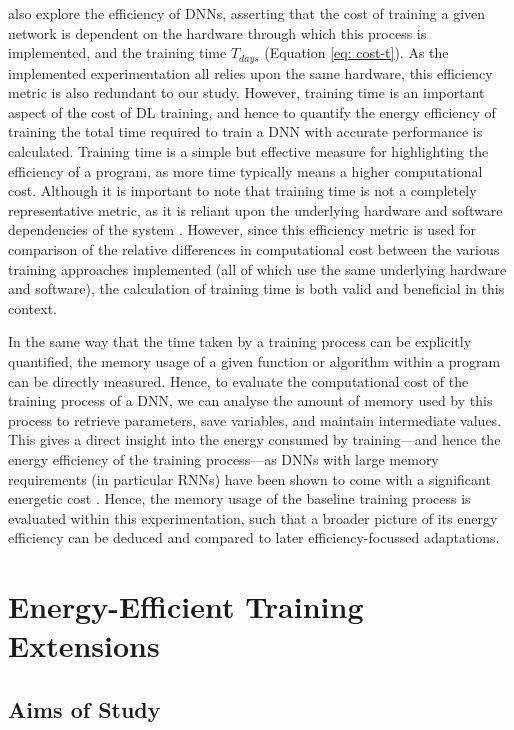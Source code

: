 \documentclass[a4paper, 11pt]{report}
\begin{document}
    \citet{amodei-2018} also explore the efficiency of DNNs, asserting that the cost of training a given network is dependent on the hardware through which this process is implemented, and the training time $T_{days}$ (Equation \ref{eq: cost-t}). As the implemented experimentation all relies upon the same hardware, this efficiency metric is also redundant to our study. However, training time is an important aspect of the cost of DL training, and hence to quantify the energy efficiency of training the total time required to train a DNN with accurate performance is calculated. Training time is a simple but effective measure for highlighting the efficiency of a program, as more time typically means a higher computational cost. Although it is important to note that training time is not a completely representative metric, as it is reliant upon the underlying hardware and software dependencies of the system \citep{schwartz-2019}. However, since this efficiency metric is used for comparison of the relative differences in computational cost between the various training approaches implemented (all of which use the same underlying hardware and software), the calculation of training time is both valid and beneficial in this context.

    In the same way that the time taken by a training process can be explicitly quantified, the memory usage of a given function or algorithm within a program can be directly measured. Hence, to evaluate the computational cost of the training process of a DNN, we can analyse the amount of memory used by this process to retrieve parameters, save variables, and maintain intermediate values. This gives a direct insight into the energy consumed by training---and hence the energy efficiency of the training process---as DNNs with large memory requirements (in particular RNNs) have been shown to come with a significant energetic cost \citep{feliz-2021}. Hence, the memory usage of the baseline training process is evaluated within this experimentation, such that a broader picture of its energy efficiency can be deduced and compared to later efficiency-focussed adaptations.


    \section{Energy-Efficient Training Extensions}
    \label{section: energy-extensions}

    \subsection{Aims of Study}
\end{document}
